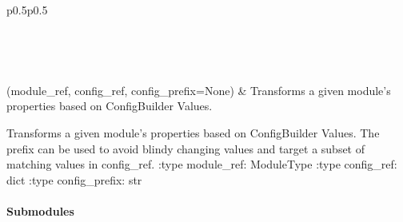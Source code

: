 \documentclass[letterpaper,10pt,english]{sphinxmanual}
\begin{document}
\begin{savenotes}\sphinxatlongtablestart\begin{longtable}[c]{p{0.5\linewidth}p{0.5\linewidth}}
\hline

\endfirsthead

%
{}\\
\hline

\endhead

\hline
{}\\
\endfoot

\endlastfoot

{\hyperref[\detokenize{autoapi/pine/pipelines/shared/transform/index:pine.pipelines.shared.transform.transform_module_by_config}]{}}(module\_ref, config\_ref, config\_prefix=None)
&
Transforms a given module’s properties based on ConfigBuilder Values.
\\
\hline
\end{longtable}\sphinxatlongtableend\end{savenotes}

\begin{fulllineitems}
\label{\detokenize{autoapi/pine/pipelines/shared/transform/index:pine.pipelines.shared.transform.transform_module_by_config}}
Transforms a given module’s properties based on ConfigBuilder Values.
The prefix can be used to avoid blindy changing values and target a subset of matching values in config\_ref.
:type module\_ref: ModuleType
:type config\_ref: dict
:type config\_prefix: str

\end{fulllineitems}



\paragraph{Submodules}
\label{\detokenize{autoapi/pine/pipelines/index:submodules}}
\end{document}
